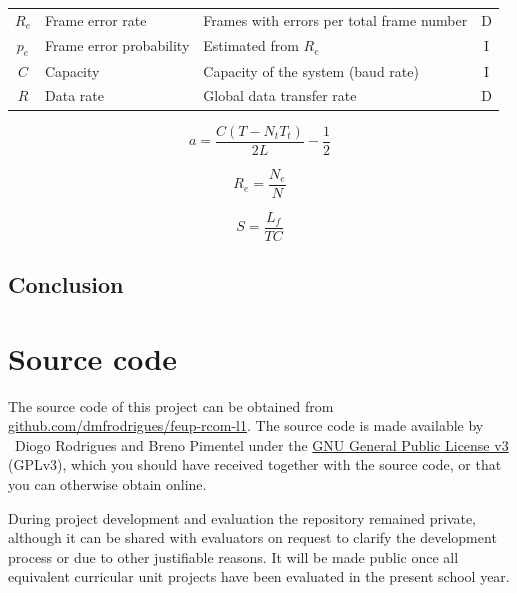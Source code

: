 \documentclass[a4paper, 11pt]{report}
\begin{document}
\begin{center}
\begin{tabular}{c | l | p{81mm} | c}
		$R_e$            & Frame error rate          & Frames with errors per total frame number                                          & D   \\
		$p_e$            & Frame error probability   & Estimated from $R_e$                                                               & I   \\
		$C$              & Capacity                  & Capacity of the system (baud rate)                                                 & I   \\
		$R$              & Data rate                 & Global data transfer rate                                                          & D   \\
		\hline \hline
	\end{tabular}
\end{center}

\begin{equation*}
	a = \frac{C(T - N_t T_t)}{2 L} - \frac{1}{2}
\end{equation*}

\begin{equation*}
	R_e = \frac{N_e}{N}
\end{equation*}

\begin{equation*}
	S = \frac{L_f}{T C}
\end{equation*}

\section{Conclusion} \label{sec:Conclusion}

\pagebreak

\appendix
\appendixpage
\addappheadtotoc
\chapter{Source code}

The source code of this project can be obtained from \href{https://github.com/dmfrodrigues/feup-rcom-l1}{github.com/dmfrodrigues/feup-rcom-l1}. The source code is made available by \textcopyright~Diogo Rodrigues and Breno Pimentel under the \href{https://www.gnu.org/licenses/gpl-3.0.en.html}{GNU General Public License v3} (GPLv3), which you should have received together with the source code, or that you can otherwise obtain online.

During project development and evaluation the repository remained private, although it can be shared with evaluators on request to clarify the development process or due to other justifiable reasons. It will be made public once all equivalent curricular unit projects have been evaluated in the present school year.
\end{document}
